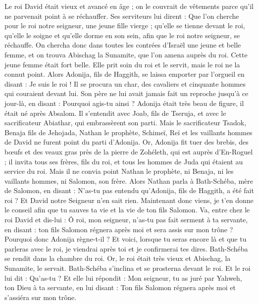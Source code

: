 \begin{multicols}{2}
\VerseOne{}Le roi David était vieux et avancé en âge ; on le couvrait de vêtements parce qu’il ne parvenait point à se réchauffer.
Ses serviteurs lui dirent : Que l'on cherche pour le roi notre seigneur, une jeune fille vierge ; qu’elle se tienne devant le roi, qu’elle le soigne et qu'elle dorme en son sein, afin que le roi notre seigneur, se réchauffe.
On chercha donc dans toutes les contrées d'Israël une jeune et belle femme, et on trouva Abischag la Sunamite, que l’on amena auprès du roi.
Cette jeune femme était fort belle. Elle prit soin du roi et le servit, mais le roi ne la connut point.
Alors Adonija, fils de Haggith, se laissa emporter par l’orgueil en disant : Je suis le roi ! Il se procura un char, des cavaliers et cinquante hommes qui couraient devant lui.
Son père ne lui avait jamais fait un reproche jusqu’à ce jour-là, en disant : Pourquoi agis-tu ainsi ? Adonija était très beau de figure, il était né après Absalom.
Il s’entendit avec Joab, fils de Tseruja, et avec le sacrificateur Abiathar, qui embrassèrent son parti.
Mais le sacrificateur Tsadok, Benaja fils de Jehojada, Nathan le prophète, Schimeï, Reï et les vaillants hommes de David ne furent point du parti d'Adonija.
Or, Adonija fit tuer des brebis, des bœufs et des veaux gras près de la pierre de Zohéleth, qui est auprès d’En-Roguel ; il invita tous ses frères, fils du roi, et tous les hommes de Juda qui étaient au service du roi.
Mais il ne convia point Nathan le prophète, ni Benaja, ni les vaillants hommes, ni Salomon, son frère.
Alors Nathan parla à Bath-Schéba, mère de Salomon, en disant : N'as-tu pas entendu qu'Adonija, fils de Haggith, a été fait roi ? Et David notre Seigneur n'en sait rien.
Maintenant donc viens, je t’en donne le conseil afin que tu sauves ta vie et la vie de ton fils Salomon.
Va, entre chez le roi David et dis-lui : Ô roi, mon seigneur, n'as-tu pas fait serment à ta servante, en disant : ton fils Salomon régnera après moi et sera assis sur mon trône ? Pourquoi donc Adonija règne-t-il ?
Et voici, lorsque tu seras encore là et que tu parleras avec le roi, je viendrai après toi et je confirmerai tes dires.
Bath-Schéba se rendit dans la chambre du roi. Or, le roi était très vieux et Abischag, la Sunamite, le servait.
Bath-Schéba s'inclina et se prosterna devant le roi. Et le roi lui dit : Qu'as-tu ?
Et elle lui répondit : Mon seigneur, tu as juré par Yahweh, ton Dieu à ta servante, en lui disant : Ton fils Salomon régnera après moi et s’assiéra sur mon trône.

\end{multicols}
